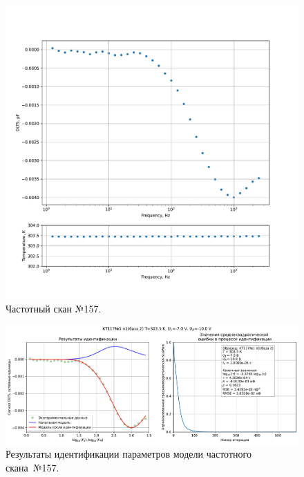 \begin{figure}[!ht]
    \centering
    \includegraphics[width=1\textwidth]{../plots/КТ117№1_п1(база 2)_2500Гц-1Гц_1пФ_+30С_-7В-10В_100мВ_20мкс_шаг_0,1.pdf}
    \caption{Частотный скан №157.}
    \label{pic:frequency_scan_157}
\end{figure}

\begin{figure}[!ht]
    \centering
    \includegraphics[width=1\textwidth]{../plots/КТ117№1_п1(база 2)_2500Гц-1Гц_1пФ_+30С_-7В-10В_100мВ_20мкс_шаг_0,1_model.pdf}
    \caption{Результаты идентификации параметров модели частотного скана~№157.}
    \label{pic:frequency_scan_model157}
\end{figure}

\pagebreak


